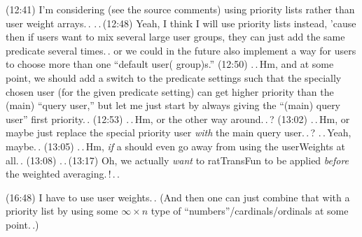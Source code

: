 \documentclass{report}
\begin{document}

(12:41) I'm considering (see the source comments) using priority lists rather than user weight arrays.\,. .\,.\,(12:48) Yeah, I think I will use priority lists instead, 'cause then if users want to mix several large user groups, they can just add the same predicate several times.\,. or we could in the future also implement a way for users to choose more than one ``default user( group)s.'' (12:50) .\,.\,Hm, and at some point, we should add a switch to the predicate settings such that the specially chosen user (for the given predicate setting) can get higher priority than the (main) ``query user,'' but let me just start by always giving the ``(main) query user'' first priority.\,. (12:53) .\,.\,Hm, or the other way around.\,.\,? (13:02) .\,.\,Hm, or maybe just replace the special priority user \emph{with} the main query user.\,.\,? .\,.\,Yeah, maybe.\,. (13:05) .\,.\,Hm, \emph{if} a should even go away from using the userWeights at all.\,. (13:08) .\,.\,(13:17) Oh, we actually \emph{want} to ratTransFun to be applied \emph{before} the weighted averaging.\,!\,.\,.

(16:48) I have to use user weights.\,. (And then one can just combine that with a priority list by using some $\infty \times n$ type of ``numbers''/cardinals/ordinals at some point.\,.)
\end{document}
